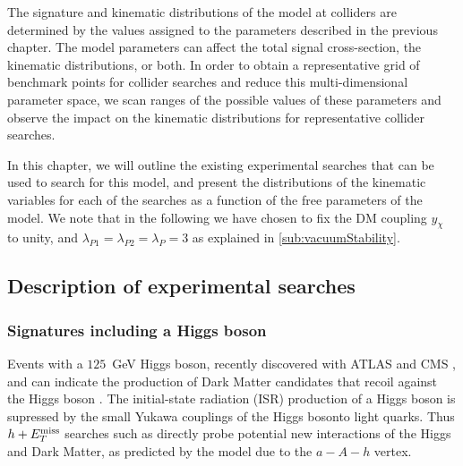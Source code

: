 The signature and kinematic distributions of the \hdma model at colliders are determined by the values assigned to the parameters described in the previous chapter. 
The model parameters can affect the total signal cross-section, the kinematic distributions, or both. 
In order to obtain a representative grid of benchmark points for collider searches and reduce this multi-dimensional parameter space, we scan ranges of the possible values of these parameters and observe the impact on the kinematic distributions for representative collider searches.


In this chapter, we will outline the existing experimental searches that can be used to search for this model, and present the distributions of the kinematic variables for each of the searches as a function of the free parameters of the model. 
We note that in the following we have chosen to fix the DM coupling  $y_\chi$ to unity, and $\lambda_{P1} = \lambda_{P2} = \lambda_P = 3$ as explained in \autoref{sub:vacuumStability}.  

\subsection{Description of experimental searches}

\subsubsection{Signatures including a Higgs boson}
Events with a  $125$~GeV Higgs boson, recently discovered with ATLAS and CMS \cite{Aad:2012tfa,Chatrchyan:2012xdj}, and \MET can indicate 
the production of Dark Matter candidates that recoil against the Higgs boson \cite{Carpenter:2013xra,Petrov:2013nia}. 
The initial-state radiation (ISR) production of a Higgs boson is supressed by the small Yukawa couplings of the Higgs bosonto light quarks. Thus $h+E_T^\mathrm{miss}$ searches such as \cite{Aaboud:2017yqz,Aaboud:2017uak} 
directly probe potential new interactions of the Higgs and Dark Matter, as predicted by the \hdma model \cite{Bauer:2017ota,No:2015xqa} due to the $a-A-h$ vertex. 

 
